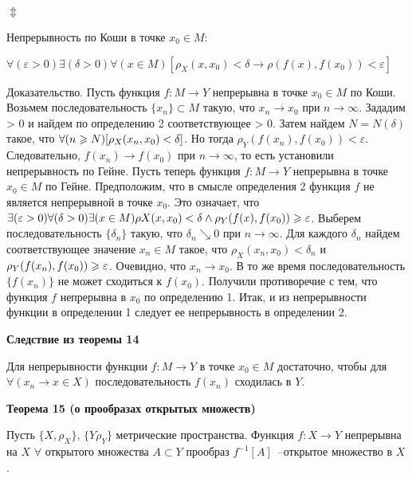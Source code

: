 {\hspace*{30mm}$\Updownarrow$

Непрерывность по Коши в точке $x_0 \in M$:

$\forall(\varepsilon>0)\exists(\delta>0)\forall(x \in M)[\rho_X(x, x_0)<\delta\rightarrow
        \rho(f(x), f(x_0))<\varepsilon]$

Доказательство. Пусть функция $f : M \to Y$ непрерывна в точке $x_0 \in M$
по Коши.
Возьмем последовательность
$\{x_n\} \subset M$ такую, что $x_n \to x_0$ при $n \to \infty$.
Зададим \varepsilon > 0 и найдем по определению 2 соответствующее \delta > 0.
Затем  найдем  $N   =  N (\delta)$  такое,
что  $\forall(n  \geqslant  N )[\rho_X(x_n, x_0)  <  \delta]$.
Но  тогда $\rho_Y (f (x_n), f (x_0)) < \varepsilon$.
Следовательно, $f (x_n) \to f (x_0)$ при $n \to \infty$,
то есть установили непрерывность по Гейне.
Пусть теперь функция $f : M \to Y$ непрерывна в точке $x_0 \in M$ по Гейне.
Предположим, что в смысле определения 2 функция $f$ не является
непрерывной в точке $x_0$. Это означает, что
$\exists(\varepsilon > 0)\forall(\delta > 0)
    \exists(x \in M )\rho X(x, x_0) < \delta
    \wedge	\rho_Y (f (x), f (x_0)) \geqslant \varepsilon$.
Выберем последовательность $\{\delta_n\}$ такую, что $\delta_n \searrow  0$
при $n \to \infty$.
Для каждого $\delta_n$ найдем соответствующее значение $x_n \in M$ такое,
что $\rho_X(x_n, x_0) < \delta_n$ и $\rho_Y (f (x_n), f (x_0)) \geqslant \varepsilon$.
Очевидно, что $x_n \to x_0$.
В то же время последовательность $\{f (x_n)\}$ не может сходиться к $f (x_0)$.
Получили противоречие с тем, что функция $f$ непрерывна в $x_0$ по определению 1.
Итак, и из непрерывности функции в определении 1 следует ее непрерывность в
определении 2.


\textbf{Следствие из теоремы 14}

Для непрерывности функции $f:M \rightarrow Y$ в точке $x_0 \in M$ достаточно, чтобы для
$\forall(x_n \rightarrow x \in X)$ последовательность ${f(x_n)}$ сходилась в $Y$.


\textbf{Теорема 15 (о прообразах открытых множеств) }

Пусть $\{X, \rho_X \}$, $\{Y \rho_Y \}$ метрические пространства. Функция $f:
    X \rightarrow Y$ непрерывна на $X$ \tttk $\forall$ открытого множества $A \subset Y$
прообраз $f^{-1}[A]$~--открытое множество в $X$.

}
